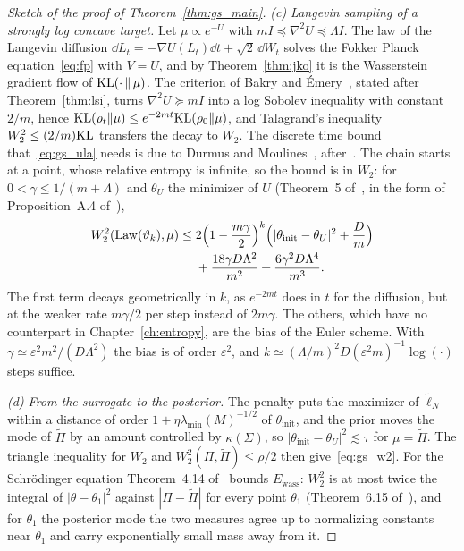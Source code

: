 \begin{proof}[Sketch of the proof of Theorem~\ref{thm:gs_main}]
\emph{(c) Langevin sampling of a strongly log concave target.} Let $\mu\propto e^{-U}$ with $mI\preceq\nabla^2U\preceq\Lambda I$. The law of the Langevin diffusion $\dd L_t=-\nabla U(L_t)\dd t+\sqrt2\,\dd W_t$ solves the Fokker Planck equation~\eqref{eq:fp} with $V=U$, and by Theorem~\ref{thm:jko} it is the Wasserstein gradient flow of $\mathrm{KL}(\cdot\,\|\,\mu)$. The criterion of Bakry and \'Emery~\cite{bakry1985}, stated after Theorem~\ref{thm:lsi}, turns $\nabla^2U\succeq mI$ into a log Sobolev inequality with constant $2/m$, hence $\mathrm{KL}(\rho_t\|\mu)\le e^{-2mt}\mathrm{KL}(\rho_0\|\mu)$, and Talagrand's inequality $W_2^2\le(2/m)\mathrm{KL}$ transfers the decay to $W_2$. The discrete time bound that~\eqref{eq:gs_ula} needs is due to Durmus and Moulines~\cite{durmusmoulines2019}, after~\cite{dalalyan2017,durmusmoulines2017}. The chain starts at a point, whose relative entropy is infinite, so the bound is in $W_2$: for $0<\gamma\le1/(m+\Lambda)$ and $\theta_U$ the minimizer of $U$ (Theorem~5 of~\cite{durmusmoulines2019}, in the form of Proposition~A.4 of~\cite{nicklwang2024}),
\[
\begin{aligned}
W_2^2(\operatorname{Law}(\vartheta_k),\mu)\le{}&2\Big(1-\frac{m\gamma}2\Big)^k\Big(|\theta_{\mathrm{init}}-\theta_U|^2+\frac Dm\Big)\\
&+\frac{18\gamma D\Lambda^2}{m^2}+\frac{6\gamma^2D\Lambda^4}{m^3}.
\end{aligned}
\]
The first term decays geometrically in $k$, as $e^{-2mt}$ does in $t$ for the diffusion, but at the weaker rate $m\gamma/2$ per step instead of $2m\gamma$. The others, which have no counterpart in Chapter~\ref{ch:entropy}, are the bias of the Euler scheme. With $\gamma\simeq\varepsilon^2m^2/(D\Lambda^2)$ the bias is of order $\varepsilon^2$, and $k\simeq(\Lambda/m)^2D(\varepsilon^2m)^{-1}\log(\cdot)$ steps suffice.

\emph{(d) From the surrogate to the posterior.} The penalty puts the maximizer of $\tilde\ell_N$ within a distance of order $1+\eta\lambda_{\min}(M)^{-1/2}$ of $\theta_{\mathrm{init}}$, and the prior moves the mode of $\tilde\Pi$ by an amount controlled by $\kappa(\Sigma)$, so $|\theta_{\mathrm{init}}-\theta_U|^2\lesssim\tau$ for $\mu=\tilde\Pi$. The triangle inequality for $W_2$ and $W_2^2(\Pi,\tilde\Pi)\le\rho/2$ then give~\eqref{eq:gs_w2}. For the Schr\"odinger equation Theorem~4.14 of~\cite{nicklwang2024} bounds $E_{\mathrm{wass}}$: $W_2^2$ is at most twice the integral of $|\theta-\theta_1|^2$ against $|\Pi-\tilde\Pi|$ for every point $\theta_1$ (Theorem~6.15 of~\cite{villani2009}), and for $\theta_1$ the posterior mode the two measures agree up to normalizing constants near $\theta_1$ and carry exponentially small mass away from it.
\end{proof}

